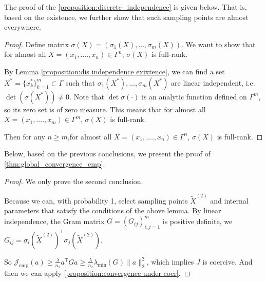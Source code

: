 \documentclass{article}
\newcommand{\T}{\mathsf{T}}
\begin{document}
The proof of the \cref{proposition:discrete_independence} is given below. That is, based on the existence, we further show that such sampling points are almost everywhere.
\begin{proof}
 Define matrix $\sigma(X)=(\sigma_{1}(X), \ldots, \sigma_{m}(X))$. We want to show that for almost all $X=(x_{1},...., x_{n})\in \Gamma^{n}$, $\sigma(X)$ is full-rank.

 By Lemma \ref{proposition:dis independence exixtence}, we can find a set $X^{*}=\{x_{k}^{*}\}_{k=1}^{m}\subset \Gamma$ such that $\sigma_{1}(X^{*}),\ldots,\sigma_{m}(X^{*})$ are linear independent, i.e. $\det(\sigma(X^{*}))\neq0$. 
 Note that $\det \sigma(\cdot)$ is an analytic function defined on $\Gamma^m$, so its zero set is of zero measure. This means that for almost all $X=(x_{1},...., x_{m})\in \Gamma^{m}$, $\sigma(X)$ is full-rank.

 Then for any $n\ge m$,for almost all $X=(x_{1},...., x_{n})\in \Gamma^{n}$, $\sigma(X)$ is full-rank.
\end{proof}
Below, based on the previous conclusions, we present the proof of \cref{thm:global_convergence_emp}.
\begin{proof}
    We only prove the second conclusion.

    Because we can, with probability 1, select sampling points $\tilde{X}^{(2)}$ and internal parameters that satisfy the conditions of the above lemma. 
    By linear independence,  the Gram matrix $G=(G_{ij})_{i,j=1}^{m}$ is positive definite, we $G_{ij}=\sigma_{i}(\tilde{X}^{(2)})^\T\sigma_{j}(\tilde{X}^{(2)})$.

    So $\mathcal{J}_{\text{emp}}(a)\ge \frac{\lambda}{n_2} a^\T G a\ge \frac{\lambda}{n_2} \lambda_{\text{min}}(G) \|a\|_{2}^2$, which implies $J$ is coercive. And then we can apply \cref{proposition:convergence under coer}.
\end{proof}
\end{document}
